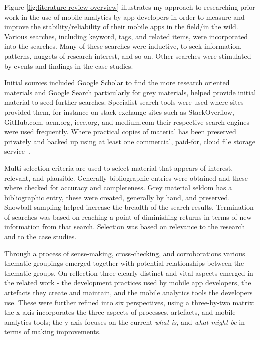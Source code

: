 Figure \ref{fig:literature-review-overview} illustrates my approach to researching prior work in the use of mobile analytics by app developers in order to measure and improve the stability/reliability of their mobile apps in the field/in the wild. Various searches, including keyword, tags, and related items, were incorporated into the searches. Many of these searches were inductive, to seek information, patterns, nuggets of research interest, and so on. Other searches were stimulated by events and findings in the case studies.

Initial sources included Google Scholar to find the more research oriented materials and Google Search particularly for grey materials, helped provide initial material to seed further searches. Specialist search tools were used where sites provided them, for instance on stack exchange sites such as StackOverflow, GitHub.com, acm.org, ieee.org, and medium.com their respective search engines were used frequently. Where practical copies of material has been preserved privately and backed up using at least one commercial, paid-for, cloud file storage service~.

Multi-selection criteria are used to select material that appears of interest, relevant, and plausible. Generally bibliographic entries were obtained and these where checked for accuracy and completeness. Grey material seldom has a bibliographic entry, these were created, generally by hand, and preserved. Snowball sampling helped increase the breadth of the search results. Termination of searches was based on reaching a point of diminishing returns in terms of new information from that search. Selection was based on relevance to the research and to the case studies.

Through a process of sense-making, cross-checking, and corroborations various thematic groupings emerged together with potential relationships between the thematic groups. On reflection three clearly distinct and vital aspects emerged in the related work - the development practices used by mobile app developers, the artefacts they create and maintain, and the mobile analytics tools the developers use. These were further refined into six perspectives, using a three-by-two matrix: the x-axis incorporates the three aspects of processes, artefacts, and mobile analytics tools; the y-axis focuses on the current \emph{what is}, and \emph{what might be} in terms of making improvements. %

